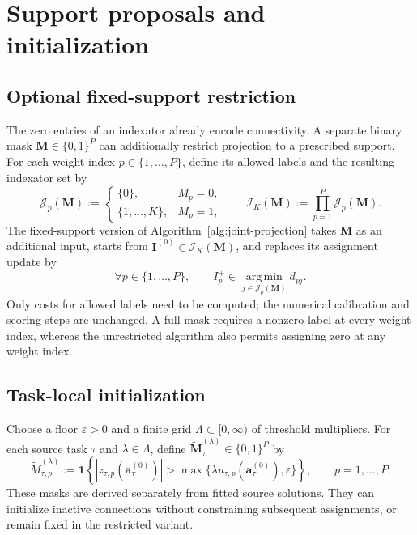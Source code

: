 \section{Support proposals and initialization}
\label{app:support-proposals}

\subsection{Optional fixed-support restriction}

The zero entries of an indexator already encode connectivity.
A separate binary mask $\mathbf M\in\{0,1\}^P$ can additionally
restrict projection to a prescribed support. For each weight index
$p\in\{1,\ldots,P\}$, define its allowed labels and the resulting
indexator set by
\begin{equation}
    \mathcal J_p(\mathbf M):=
        \begin{cases}
            \{0\}, & M_p=0,\\
            \{1,\ldots,K\}, & M_p=1,
        \end{cases}
    \qquad
    \mathcal I_K(\mathbf M):=
        \prod_{p=1}^P\mathcal J_p(\mathbf M).
    \label{eq:appendix-fixed-support}
\end{equation}
The fixed-support version of Algorithm~\ref{alg:joint-projection}
takes $\mathbf M$ as an additional input, starts from
$\mathbf I^{(0)}\in\mathcal I_K(\mathbf M)$, and replaces its
assignment update by
\begin{equation}
    \forall p\in\{1,\ldots,P\},\qquad
    I_p^+\in\operatorname*{arg\,min}_{j\in\mathcal J_p(\mathbf M)}d_{pj}.
    \label{eq:appendix-restricted-assignment}
\end{equation}
Only costs for allowed labels need to be computed; the numerical
calibration and scoring steps are unchanged. A full mask requires
a nonzero label at every weight index, whereas the unrestricted algorithm
also permits assigning zero at any weight index.

\subsection{Task-local initialization}
\label{app:task-local-initialization}

Choose a floor $\varepsilon>0$ and a finite grid
$\Lambda\subset[0,\infty)$ of threshold multipliers.
For each source task $\tau$ and $\lambda\in\Lambda$, define
$\widetilde{\mathbf M}_\tau^{(\lambda)}\in\{0,1\}^P$ by
\begin{equation}
    \widetilde M_{\tau,p}^{(\lambda)}
    :=\mathbf1\!\left\{
        |z_{\tau,p}(\mathbf a_\tau^{(0)})|
        >\max\{\lambda u_{\tau,p}(\mathbf a_\tau^{(0)}),\varepsilon\}
    \right\},\qquad p=1,\ldots,P.
    \label{eq:method-source-support}
\end{equation}
These masks are derived separately from fitted source solutions.
They can initialize inactive connections without constraining subsequent
assignments, or remain fixed in the restricted variant.

